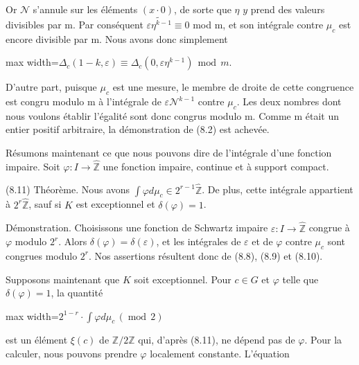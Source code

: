 \documentclass[11pt]{article}
\newcommand{\DFormula}[1]{\par\smallskip\noindent\begin{adjustbox}{max width=\linewidth}$\displaystyle #1$\end{adjustbox}\par\smallskip}
\begin{document}
\par
Or \(\mathcal{N}\) s’annule sur les éléments \((x\cdot 0)\), de sorte que \(\eta \) \(y\) prend des valeurs divisibles par m. Par conséquent \(\widetilde{\varepsilon \eta ^{k-1}}\equiv 0\) mod m, et son intégrale contre \(\mu _{c}\) est encore divisible par m. Nous avons donc simplement\par
\par
\DFormula{\Delta _{c}(1-k,\varepsilon )\equiv \Delta _{c}(0,\varepsilon \eta ^{k-1})\,\operatorname{mod}\,m.}
\par
D’autre part, puisque \(\mu _{c}\) est une mesure, le membre de droite de cette congruence est congru modulo m à l’intégrale de \(\varepsilon \mathcal{N}^{k-1}\) contre \(\mu _{c}\). Les deux nombres dont nous voulons établir l’égalité sont donc congrus modulo m. Comme m était un entier positif arbitraire, la démonstration de (8.2) est achevée.\par
\par
Résumons maintenant ce que nous pouvons dire de l’intégrale d’une fonction impaire. Soit \(\varphi :I\to \widehat{\mathbb{Z}}\) une fonction impaire, continue et à support compact.\par
\par
(8.11) Théorème. Nous avons \(\int \varphi d\mu _{c}\in 2^{r-1}\widehat{\mathbb{Z}}\). De plus, cette intégrale appartient à \(2^{r}\widehat{\mathbb{Z}}\), sauf si \(K\) est exceptionnel et \(\delta (\varphi )=1\).\par
\par
Démonstration. Choisissons une fonction de Schwartz impaire \(\varepsilon :I\to \widehat{\mathbb{Z}}\) congrue à \(\varphi \) modulo \(2^{r}\). Alors \(\delta (\varphi )=\delta (\varepsilon )\), et les intégrales de \(\varepsilon \) et de \(\varphi \) contre \(\mu _{c}\) sont congrues modulo \(2^{r}\). Nos assertions résultent donc de (8.8), (8.9) et (8.10).\par
\par
Supposons maintenant que \(K\) soit exceptionnel. Pour \(c\in G\) et \(\varphi \) telle que \(\delta (\varphi )=1\), la quantité\par
\par
\DFormula{2^{1-r}\cdot \int \varphi d\mu _{c}\,(\operatorname{mod}\,2)}
\par
est un élément \(\xi (c)\) de \(\mathbb{Z}/2\mathbb{Z}\) qui, d’après (8.11), ne dépend pas de \(\varphi \). Pour la calculer, nous pouvons prendre \(\varphi \) localement constante. L’équation\par
\end{document}
